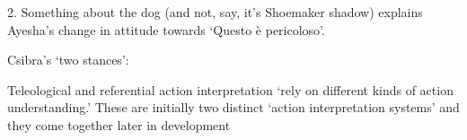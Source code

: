 \documentclass[12pt]{extarticle}
\begin{document}
\begin{multicols*}{3}
2. Something about the dog (and not, say, it’s Shoemaker shadow) explains Ayesha’s change in attitude towards  ‘Questo è pericoloso’.

Csibra’s ‘two stances’:

Teleological and referential action interpretation ‘rely on different kinds of action understanding.’
These are initially two distinct ‘action interpretation systems’ and they come together later in development
\citep[p.~456]{Csibra:2003kp}






\footnotesize


\end{multicols*}
\end{document}
